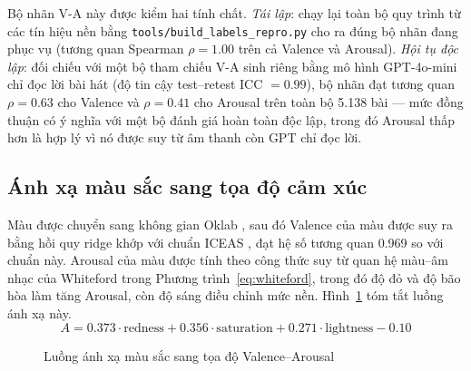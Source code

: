 \documentclass[../DoAn.tex]{subfiles}
\begin{document}
Bộ nhãn V-A này được kiểm hai tính chất. \textit{Tái lập}: chạy lại toàn bộ quy trình từ các tín hiệu nền bằng \texttt{tools/build\_labels\_repro.py} cho ra đúng bộ nhãn đang phục vụ (tương quan Spearman $\rho = 1.00$ trên cả Valence và Arousal). \textit{Hội tụ độc lập}: đối chiếu với một bộ tham chiếu V-A sinh riêng bằng mô hình GPT-4o-mini chỉ đọc lời bài hát (độ tin cậy test--retest ICC $= 0.99$), bộ nhãn đạt tương quan $\rho = 0.63$ cho Valence và $\rho = 0.41$ cho Arousal trên toàn bộ 5.138 bài --- mức đồng thuận có ý nghĩa với một bộ đánh giá hoàn toàn độc lập, trong đó Arousal thấp hơn là hợp lý vì nó được suy từ âm thanh còn GPT chỉ đọc lời.

\subsection{Ánh xạ màu sắc sang tọa độ cảm xúc}
\label{subsection:4.2.2}
Màu được chuyển sang không gian Oklab \cite{ottosson2020oklab}, sau đó Valence của màu được suy ra bằng hồi quy ridge khớp với chuẩn ICEAS \cite{jonauskaite2020universal}, đạt hệ số tương quan 0.969 so với chuẩn này. Arousal của màu được tính theo công thức suy từ quan hệ màu--âm nhạc của Whiteford \cite{whiteford2018color} trong Phương trình~\eqref{eq:whiteford}, trong đó độ đỏ và độ bão hòa làm tăng Arousal, còn độ sáng điều chỉnh mức nền. Hình~\ref{fig:color-flow} tóm tắt luồng ánh xạ này.
\begin{equation}\label{eq:whiteford}
    A = 0.373 \cdot \text{redness} + 0.356 \cdot \text{saturation} + 0.271 \cdot \text{lightness} - 0.10
\end{equation}

\begin{figure}[h!]
\centering
{}
\caption{Luồng ánh xạ màu sắc sang tọa độ Valence--Arousal}
\label{fig:color-flow}
\end{figure}
\end{document}
